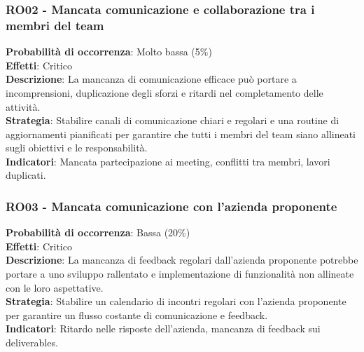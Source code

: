 \documentclass[a4paper,12pt]{article}
\begin{document}
\subsubsection{RO02 - Mancata comunicazione e collaborazione tra i membri del team}
\label{RO02}
\textbf{Probabilità di occorrenza}: Molto bassa (5\%)\\
\textbf{Effetti}: Critico\\
\textbf{Descrizione}: La mancanza di comunicazione efficace può portare a incomprensioni, duplicazione degli sforzi e ritardi nel completamento delle attività.\\
\textbf{Strategia}: Stabilire canali di comunicazione chiari e regolari e una routine di aggiornamenti pianificati per garantire che tutti i membri del team siano allineati sugli obiettivi e le responsabilità.\\
\textbf{Indicatori}: Mancata partecipazione ai meeting, conflitti tra membri, lavori duplicati.

\subsubsection{RO03 - Mancata comunicazione con l'azienda proponente}
\label{RO03}
\textbf{Probabilità di occorrenza}: Bassa (20\%)\\
\textbf{Effetti}: Critico\\
\textbf{Descrizione}: La mancanza di feedback regolari dall'azienda proponente potrebbe portare a uno sviluppo rallentato e implementazione di funzionalità non allineate con le loro aspettative.\\
\textbf{Strategia}: Stabilire un calendario di incontri regolari con l'azienda proponente per garantire un flusso costante di comunicazione e feedback.\\
\textbf{Indicatori}: Ritardo nelle risposte dell'azienda, mancanza di feedback sui deliverables.
\end{document}
